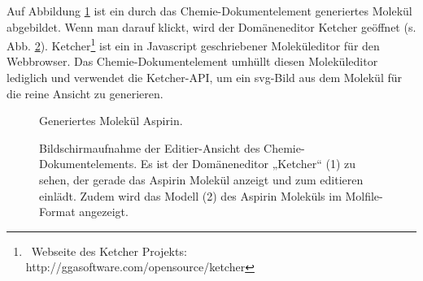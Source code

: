  
Auf Abbildung \ref{Aspirin} ist ein durch das Chemie-Dokumentelement generiertes Molekül abgebildet. Wenn man darauf klickt, wird der Domäneneditor Ketcher geöffnet (s. Abb. \ref{chemieeditieren}). Ketcher\footnote{~Webseite des Ketcher Projekts: http://ggasoftware.com/opensource/ketcher} ist ein in Javascript geschriebener Moleküleditor für den Webbrowser. Das Chemie-Dokumentelement umhüllt diesen Moleküleditor lediglich und verwendet die Ketcher-API, um ein svg-Bild aus dem Molekül für die reine Ansicht zu generieren.

 
\begin{figure}[h!]
\centering
\advance\leftskip-2.5cm
\caption{ Generiertes Molekül Aspirin. }\label{Aspirin}
\end{figure}
 
\begin{figure}[h!]
\centering
\advance\leftskip-2.5cm
\caption{ Bildschirmaufnahme der Editier-Ansicht des Chemie-Dokumentelements. Es ist der Domäneneditor „Ketcher“ (1) zu sehen, der gerade das Aspirin Molekül anzeigt und zum editieren einlädt. Zudem wird das Modell (2) des Aspirin Moleküls im Molfile-Format angezeigt. }\label{chemieeditieren}
\end{figure}
 
